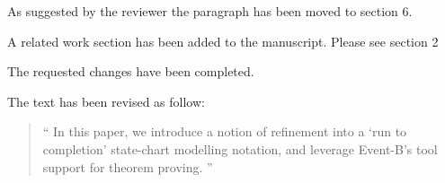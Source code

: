 \documentclass{response}
\begin{document}
\begin{comment}{Reviewer \#2}
  - In the introduction, the paragraph before last "Page 3: lines 7 to 17" that
  compares the proposed approach to the work presented in [4] may be pushed to
  Section 3 or 4 since such comparison is meaningless before presenting the
  details of the approach and the example.
\end{comment}

\begin{response}
  As suggested by the reviewer the paragraph has been moved to section 6. 
\end{response}


\begin{comment}{Reviewer \#2}
 - The paper lacks a related work section. Please add one.
\end{comment}

\begin{response}
A related work section has been added to the manuscript. Please see section 2
\end{response}



\begin{comment}{Reviewer \#2}
Minor points:
  - After an introductory word or phrase, use a comma (this is a recurrent in
  the paper). For example, e.g. --> e.g., i.e. --> i.e., "To verify liveness 
  we outline" --> "To verify liveness,  we outline", etc.
\end{comment}

\begin{response}
  The requested changes have been completed.
\end{response}


\begin{comment}{Reviewer \#2}
- Abstract: "We introduce" --> "In this paper, we introduce".
\end{comment}

\begin{response}
  The text has been revised as follow:
  \begin{quote}
    `` In this paper, we introduce a notion of refinement into a ‘run to completion’ state-chart 
    modelling notation, and leverage Event-B’s tool support for theorem proving. ''
  \end{quote}
\end{response}


\begin{comment}{Reviewer \#2}
- Add "Even-B" to the list of keywords.
\end{comment}
\end{document}
